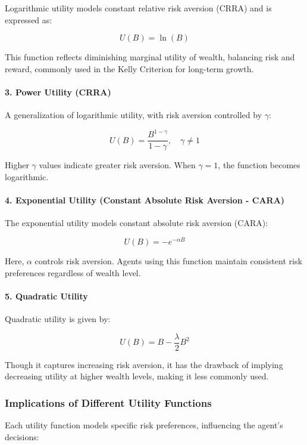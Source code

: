 Logarithmic utility models constant relative risk aversion (CRRA) and is expressed as:

\[
U(B) = \ln(B)
\]

This function reflects diminishing marginal utility of wealth, balancing risk and reward, commonly used in the Kelly Criterion \cite{Kelly1956} \cite{Thorp1975} for long-term growth.

\paragraph{3. Power Utility (CRRA)}

A generalization of logarithmic utility, with risk aversion controlled by \( \gamma \):

\[
U(B) = \frac{B^{1 - \gamma}}{1 - \gamma}, \quad \gamma \neq 1
\]

Higher \( \gamma \) values indicate greater risk aversion. When \( \gamma = 1 \), the function becomes logarithmic.

\paragraph{4. Exponential Utility (Constant Absolute Risk Aversion - CARA)}

The exponential utility models constant absolute risk aversion (CARA):

\[
U(B) = -e^{-\alpha B}
\]

Here, \( \alpha \) controls risk aversion. Agents using this function maintain consistent risk preferences regardless of wealth level.

\paragraph{5. Quadratic Utility}

Quadratic utility is given by:

\[
U(B) = B - \frac{\lambda}{2} B^2
\]

Though it captures increasing risk aversion, it has the drawback of implying decreasing utility at higher wealth levels, making it less commonly used.

\subsubsection{Implications of Different Utility Functions}

Each utility function models specific risk preferences, influencing the agent’s decisions:

